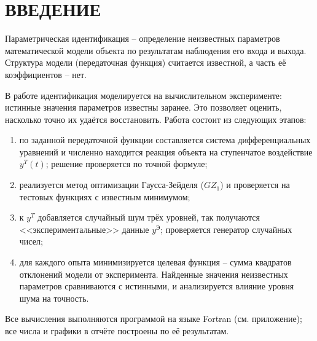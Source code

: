 \newpage
\part*{ВВЕДЕНИЕ}
    Параметрическая идентификация -- определение неизвестных параметров математической модели объекта по результатам наблюдения его входа и выхода. Структура модели (передаточная функция) считается известной, а часть её коэффициентов -- нет.

    В работе идентификация моделируется на вычислительном эксперименте: истинные значения параметров известны заранее. Это позволяет оценить, насколько точно их удаётся восстановить. Работа состоит из следующих этапов:
    \begin{enumerate}
        \item по заданной передаточной функции составляется система дифференциальных уравнений и численно находится реакция объекта на ступенчатое воздействие $y^T(t)$; решение проверяется по точной формуле;
        \item реализуется метод оптимизации Гаусса-Зейделя ($GZ_1$) и проверяется на тестовых функциях с известным минимумом;
        \item к $y^T$ добавляется случайный шум трёх уровней, так получаются <<экспериментальные>> данные $y^{\text{Э}}$; проверяется генератор случайных чисел;
        \item для каждого опыта минимизируется целевая функция -- сумма квадратов отклонений модели от эксперимента. Найденные значения неизвестных параметров сравниваются с истинными, и анализируется влияние уровня шума на точность.
    \end{enumerate}

    Все вычисления выполняются программой на языке Fortran (см. приложение); все числа и графики в отчёте построены по её результатам.
